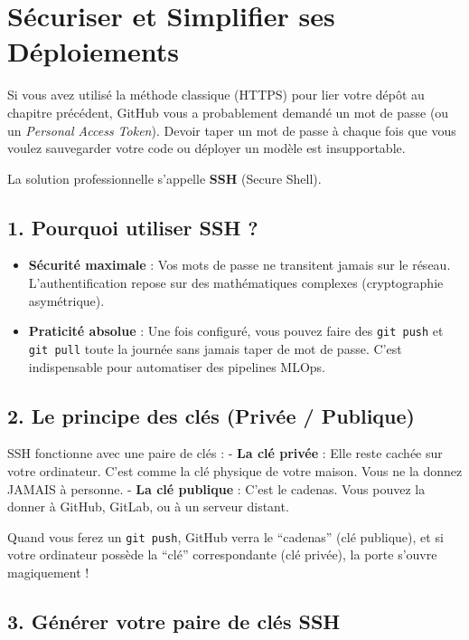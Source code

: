 \documentclass[
  letterpaper,
  DIV=11,
  numbers=noendperiod]{scrreprt}
\providecommand{\tightlist}{%
  \setlength{\itemsep}{0pt}\setlength{\parskip}{0pt}}
\begin{document}
\section{Sécuriser et Simplifier ses
Déploiements}\label{suxe9curiser-et-simplifier-ses-duxe9ploiements}

Si vous avez utilisé la méthode classique (HTTPS) pour lier votre dépôt
au chapitre précédent, GitHub vous a probablement demandé un mot de
passe (ou un \emph{Personal Access Token}). Devoir taper un mot de passe
à chaque fois que vous voulez sauvegarder votre code ou déployer un
modèle est insupportable.

La solution professionnelle s'appelle \textbf{SSH} (Secure Shell).

\subsection{1. Pourquoi utiliser SSH ?}\label{pourquoi-utiliser-ssh}

\begin{itemize}
\tightlist
\item
  \textbf{Sécurité maximale} : Vos mots de passe ne transitent jamais
  sur le réseau. L'authentification repose sur des mathématiques
  complexes (cryptographie asymétrique).
\item
  \textbf{Praticité absolue} : Une fois configuré, vous pouvez faire des
  \texttt{git\ push} et \texttt{git\ pull} toute la journée sans jamais
  taper de mot de passe. C'est indispensable pour automatiser des
  pipelines MLOps.
\end{itemize}

\subsection{2. Le principe des clés (Privée /
Publique)}\label{le-principe-des-cluxe9s-privuxe9e-publique}

SSH fonctionne avec une paire de clés : - \textbf{La clé privée} : Elle
reste cachée sur votre ordinateur. C'est comme la clé physique de votre
maison. Vous ne la donnez JAMAIS à personne. - \textbf{La clé publique}
: C'est le cadenas. Vous pouvez la donner à GitHub, GitLab, ou à un
serveur distant.

Quand vous ferez un \texttt{git\ push}, GitHub verra le ``cadenas'' (clé
publique), et si votre ordinateur possède la ``clé'' correspondante (clé
privée), la porte s'ouvre magiquement !

\subsection{3. Générer votre paire de clés
SSH}\label{guxe9nuxe9rer-votre-paire-de-cluxe9s-ssh}
\end{document}
